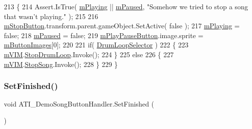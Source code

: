 \begin{DoxyCode}
213     \{
214         Assert.IsTrue( \hyperlink{class_a_t_i___demo_song_button_handler_aefbba0db111a0d4ba1b1d9f5c1cae41d}{mPlaying} || \hyperlink{class_a_t_i___demo_song_button_handler_abee877053d95bfba813d61d5a5d87a23}{mPaused}, \textcolor{stringliteral}{"Somehow we tried to stop a song that wasn't
       playing."} );
215 
216         \hyperlink{class_a_t_i___demo_song_button_handler_ad6a342b9b2333c8c613b968a0ca7545c}{mStopButton}.transform.parent.gameObject.SetActive( \textcolor{keyword}{false} );
217         \hyperlink{class_a_t_i___demo_song_button_handler_aefbba0db111a0d4ba1b1d9f5c1cae41d}{mPlaying} = \textcolor{keyword}{false};
218         \hyperlink{class_a_t_i___demo_song_button_handler_abee877053d95bfba813d61d5a5d87a23}{mPaused} = \textcolor{keyword}{false};
219         \hyperlink{class_a_t_i___demo_song_button_handler_a9f3be8593e24316510ca461f105061fd}{mPlayPauseButton}.image.sprite = \hyperlink{class_a_t_i___demo_song_button_handler_a9d62cca93ee54ba52e0c7de5f30d9490}{mButtonImages}[0];
220 
221         \textcolor{keywordflow}{if}( \hyperlink{class_a_t_i___demo_song_button_handler_a772b617c22a316a99f3a4b6979d0657a}{DrumLoopSelector} )
222         \{
223             \hyperlink{class_a_t_i___demo_song_button_handler_ac078f283ce74a7b310ebb2cbbc55f70b}{mVIM}.\hyperlink{group___v_i_m_events_ga9466995fd3b4a07351a8577042ee8b31}{StopDrumLoop}.Invoke();
224         \}
225         \textcolor{keywordflow}{else}
226         \{
227             \hyperlink{class_a_t_i___demo_song_button_handler_ac078f283ce74a7b310ebb2cbbc55f70b}{mVIM}.\hyperlink{group___v_i_m_events_gaa9e464629814abf2e4db88e240fac72c}{StopSong}.Invoke();
228         \}
229     \}
\end{DoxyCode}
\mbox{\label{class_a_t_i___demo_song_button_handler_aec5406e1eb0c885f0e6fe044cfe4113e}} 
\subsubsection{\texorpdfstring{Set\+Finished()}{SetFinished()}}
{\footnotesize\ttfamily void A\+T\+I\+\_\+\+Demo\+Song\+Button\+Handler.\+Set\+Finished (\begin{DoxyParamCaption}{ }\end{DoxyParamCaption})}



